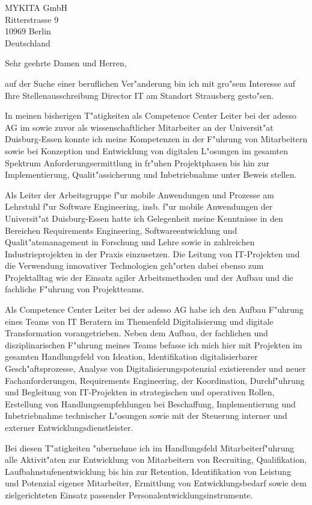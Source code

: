 \documentclass[10pt,a4paper]{dinbrief}
\date{\today}
\begin{document}
 
\begin{letter}  
{%
	MYKITA GmbH\\
	Ritterstrasse 9\\
	10969 Berlin\\
	Deutschland
}
\subject{\bf Bewerbung Director IT}
\opening{Sehr geehrte Damen und Herren,}
auf der Suche einer beruflichen Ver"anderung bin ich mit gro"sem Interesse auf Ihre Stellenausschreibung Director IT am Standort Strausberg gesto"sen. 

In meinen bisherigen T"atigkeiten als Competence Center Leiter bei der adesso AG im sowie zuvor als wissenschaftlicher Mitarbeiter an der Universit"at Duisburg-Essen konnte ich meine Kompetenzen in der F"uhrung von Mitarbeitern sowie bei Konzeption und Entwicklung von digitalen L"osungen im gesamten Spektrum Anforderungsermittlung in fr"uhen Projektphasen bis hin zur Implementierung, Qualit"assicherung und Inbetriebnahme unter Beweis stellen.

Als Leiter der Arbeitsgruppe f"ur mobile Anwendungen und Prozesse am Lehrstuhl f"ur Software Engineering, insb. f"ur mobile Anwendungen der Universit"at Duisburg-Essen hatte ich Gelegenheit meine Kenntnisse in den Bereichen Requirements Engineering, Softwareentwicklung und Qualit"atsmanagement in Forschung und Lehre sowie in zahlreichen Industrieprojekten in der Praxis einzusetzen. Die Leitung von IT-Projekten und die Verwendung innovativer Technologien geh"orten dabei ebenso zum Projektalltag wie der Einsatz agiler Arbeitsmethoden und der Aufbau und die fachliche F"uhrung von Projektteams.

Als Competence Center Leiter bei der adesso AG habe ich den Aufbau F"uhrung eines Teams von IT Beratern im Themenfeld Digitalisierung und digitale Transformation vorangetrieben. Neben dem Aufbau, der fachlichen und disziplinarischen F"uhrung meines Teams befasse ich mich hier mit Projekten im gesamten Handlungsfeld von Ideation, Identifikation digitalisierbarer Gesch"aftsprozesse, Analyse von Digitalisierungspotenzial existierender und neuer Fachanforderungen, Requirements Engineering, der Koordination, Durchf"uhrung und Begleitung von IT-Projekten in strategischen und operativen Rollen, Erstellung von Handlungsempfehlungen bei Beschaffung, Implementierung und Inbetriebnahme technischer L"osungen sowie mit der Steuerung interner und externer Entwicklungsdienstleister. 

Bei diesen T"atigkeiten "ubernehme ich im Handlungsfeld Mitarbeiterf"uhrung alle Aktivit"aten zur Entwicklung von Mitarbeitern von Recruiting, Qualifikation, Laufbahnstufenentwicklung bis hin zur Retention, Identifikation von Leistung und Potenzial eigener Mitarbeiter, Ermittlung von Entwicklungsbedarf sowie dem zielgerichteten Einsatz passender Personalentwicklungsinstrumente.


\end{letter}
\end{document}
